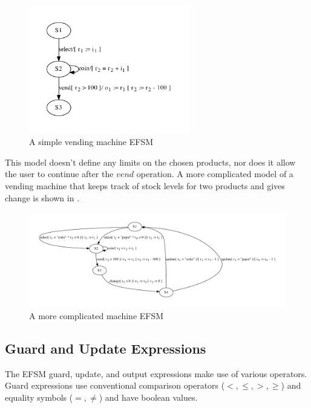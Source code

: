 \begin{figure}[h]
\begin{center}
\includegraphics[width=7cm]{figures/efsm/vend-real.pdf}
\caption{A simple vending machine EFSM}
\label{fig:vendsimple}
\end{center}
\end{figure}

This model doesn't define any limits on the chosen products, nor does it allow the user to continue after the $vend$ operation. A more complicated model of a vending machine that keeps track of stock levels for two products and gives change is shown in .

\begin{figure}[h]
\begin{center}
\hspace*{-1.5cm}\includegraphics[width=18cm]{figures/efsm/vend-complicated.pdf}
\caption{A more complicated machine EFSM}
\label{fig:vendcomplicated}
\end{center}
\end{figure}

\subsection{Guard and Update Expressions}
\label{Expressions}

The EFSM guard, update, and output expressions make use of various operators. Guard expressions use conventional comparison operators ($<, \leq, >, \geq$) and equality symbols ($=, \neq$) and have boolean values.

